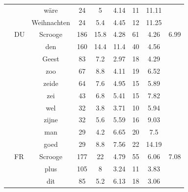 \documentclass[shortpaper]{revdetua}
\begin{document}
\begin{table}[H]
\begin{tabular}{@{}ccccccccc@{}}
     & \multicolumn{1}{l|}{}   & wäre        & 24           & 5            & 4.14    & 11      & 11.11             &              \\
     & \multicolumn{1}{l|}{}   & Weihnachten & 24           & 5.4          & 4.45    & 12      & 11.25             &              \\ \cmidrule(l){2-9} 
     & \multicolumn{1}{l|}{DU} & Scrooge     & 186          & 15.8         & 4.28    & 61      & 4.26              & 6.99         \\
     & \multicolumn{1}{l|}{}   & den         & 160          & 14.4         & 11.4    & 40      & 4.56              &              \\
     & \multicolumn{1}{l|}{}   & Geest       & 83           & 7.2          & 2.97    & 18      & 4.29              &              \\
     & \multicolumn{1}{l|}{}   & zoo         & 67           & 8.8          & 4.11    & 19      & 6.52              &              \\
     & \multicolumn{1}{l|}{}   & zeide       & 64           & 7.6          & 4.95    & 15      & 5.89              &              \\
     & \multicolumn{1}{l|}{}   & zei         & 43           & 6.8          & 5.41    & 15      & 7.82              &              \\
     & \multicolumn{1}{l|}{}   & wel         & 32           & 3.8          & 3.71    & 10      & 5.94              &              \\
     & \multicolumn{1}{l|}{}   & zijne       & 32           & 5.6          & 5.59    & 16      & 9.03              &              \\
     & \multicolumn{1}{l|}{}   & man         & 29           & 4.2          & 6.65    & 20      & 7.5               &              \\
     & \multicolumn{1}{l|}{}   & goed        & 29           & 8.8          & 7.56    & 22      & 14.19             &              \\ \cmidrule(l){2-9} 
     & \multicolumn{1}{l|}{FR} & Scrooge     & 177          & 22           & 4.79    & 55      & 6.06              & 7.08         \\
     & \multicolumn{1}{l|}{}   & plus        & 105          & 8            & 3.24    & 11      & 3.83              &              \\
     & \multicolumn{1}{l|}{}   & dit         & 85           & 5.2          & 6.13    & 18      & 3.06              &              \\

\end{tabular}
\end{table}
\end{document}

